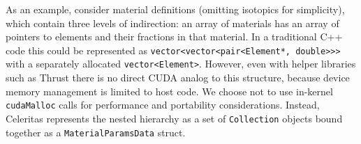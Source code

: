 As an example, consider material definitions (omitting isotopics for
simplicity), which contain three levels of indirection: an array of
materials has an array of pointers to elements and their fractions in
that material. In a traditional C++ code this could be represented as
\texttt{vector\textless{}vector\textless{}pair\textless{}Element*,\ double\textgreater{}\textgreater{}\textgreater{}}
with a separately allocated
\texttt{vector\textless{}Element\textgreater{}}. However, even with helper
libraries such as Thrust \cite{thrust} there is no direct CUDA analog to this
structure, because device memory management is limited to host code.
We choose not to use in-kernel \texttt{cudaMalloc} calls for
performance and portability considerations. Instead, Celeritas
represents the nested hierarchy as a set of \texttt{Collection} objects
bound together as a \texttt{MaterialParamsData} struct.
%
\begin{Shaded}
\begin{Highlighting}[]
\NormalTok{\{}
\NormalTok{\};}

\NormalTok{\{}
\NormalTok{\};}

\NormalTok{\{}
\NormalTok{\};}

\NormalTok{\{}
    \NormalTok{\textless{}} 

     

\NormalTok{=(}
\NormalTok{\};}
\end{Highlighting}
\end{Shaded}

